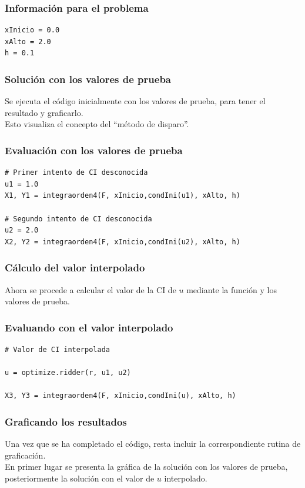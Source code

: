 \documentclass[12pt]{beamer}
\begin{document}
\begin{frame}[fragile]
\frametitle{Información para el problema}
\begin{lstlisting}[caption=Declaración del intervalo y paso de integración]
xInicio = 0.0
xAlto = 2.0
h = 0.1
\end{lstlisting}
\end{frame}
\begin{frame}
\frametitle{Solución con los valores de prueba}
Se ejecuta el código inicialmente con los valores de prueba, para tener el resultado y graficarlo.
\\
\bigskip
\pause
Esto visualiza el concepto del \enquote{método de disparo}.
\end{frame}
\begin{frame}[fragile]
\frametitle{Evaluación con los valores de prueba}
\begin{lstlisting}[caption=Ocupando los valores de prueba]
# Primer intento de CI desconocida
u1 = 1.0
X1, Y1 = integraorden4(F, xInicio,condIni(u1), xAlto, h)

# Segundo intento de CI desconocida
u2 = 2.0
X2, Y2 = integraorden4(F, xInicio,condIni(u2), xAlto, h)
\end{lstlisting}
\end{frame}
\begin{frame}
\frametitle{Cálculo del valor interpolado}
Ahora se procede a calcular el valor de la CI de $u$ mediante la función  y los valores de prueba.
\end{frame}
\begin{frame}[fragile]
\frametitle{Evaluando con el valor interpolado}
\begin{lstlisting}[caption=Calculando el valor interpolado para luego usarlo]
# Valor de CI interpolada

u = optimize.ridder(r, u1, u2)

X3, Y3 = integraorden4(F, xInicio,condIni(u), xAlto, h)
\end{lstlisting}
\end{frame}
\begin{frame}
\frametitle{Graficando los resultados}
Una vez que se ha completado el código, resta incluir la correspondiente rutina de graficación.
\\
\bigskip
\pause
En primer lugar se presenta la gráfica de la solución con los valores de prueba, posteriormente la solución con el valor de $u$ interpolado.
\end{frame}
\end{document}
